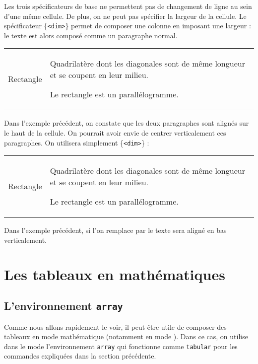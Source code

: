 Les trois spécificateurs de base ne permettent pas de changement de ligne au sein d'une même cellule. De plus, on ne peut pas spécifier la largeur de la cellule. Le spécificateur \{\texttt{<dim>}\} permet de composer une colonne en imposant une largeur : le texte est alors composé comme un paragraphe normal. \bigskip

\begin{SideBySideExample}
    \begin{tabular}{r|p{4.5cm}}
        Rectangle & Quadrilat\`ere dont les diagonales
        sont de m\^eme longueur et
        se coupent en leur milieu.\par
        Le rectangle est un parall\'elogramme.
    \end{tabular}
\end{SideBySideExample}
\bigskip

Dans l'exemple précédent, on constate que les deux paragraphes sont alignés sur le haut de la cellule. On pourrait avoir envie de centrer verticalement ces paragraphes. On utilisera simplement \{\texttt{<dim>}\} :\bigskip


\begin{SideBySideExample}
    \begin{tabular}{r|m{4.5cm}}
        Rectangle & Quadrilat\`ere dont les diagonales
        sont de m\^eme longueur et
        se coupent en leur milieu.\par
        Le rectangle est un parall\'elogramme.
    \end{tabular}
\end{SideBySideExample}

\bigskip

\begin{info}
    Dans l'exemple précédent, si l'on remplace  par 
    le texte sera aligné en bas verticalement.
\end{info}


\section{Les tableaux en mathématiques}\label{tabmath}
\subsection{L'environnement \texttt{array}}

Comme nous allons rapidement le voir, il peut être utile de composer des tableaux en mode mathématique (notamment en mode ). Dans ce cas, on utilise dans le mode l'environnement \texttt{array} qui fonctionne comme \texttt{tabular} pour les commandes expliquées dans la section précédente.\bigskip

